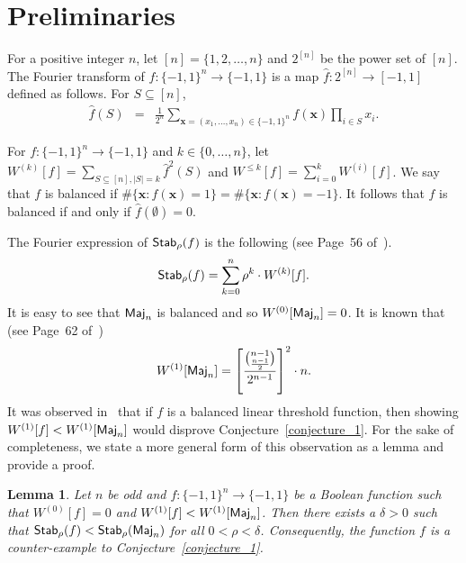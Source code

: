 \documentclass[11pt]{article}
\newtheorem{lemma} {Lemma}
\newcommand{\sym}[1]{{\sf #1}}
\begin{document}
\section{Preliminaries \label{sec-prelim} }
For a positive integer $n$, let $[n] = \{1, 2,\ldots, n\}$ and $2^{[n]}$ be the power set of $[n]$. 
The Fourier transform of $f:\{-1,1\}^n\rightarrow \{-1,1\}$ is a map $\hat{f}:2^{[n]}\rightarrow [-1,1]$ defined as follows. For $S\subseteq [n]$, 
\begin{eqnarray}\label{eqn-fourier}
	\hat{f}(S) & = & \frac{1}{2^n} \sum_{\mathbf{x}=(x_1,\ldots,x_n)\in\{-1,1\}^n} f(\mathbf{x}) \prod_{i\in S}x_i.
\end{eqnarray}

For $f:\{-1,1\}^n\rightarrow\{-1,1\}$ and $k\in\{0,\ldots,n\}$, let ${W}^{(k)}[f]=\sum_{S\subseteq[n],|S|=k}\hat{f}^2(S)$
and ${W}^{\leq k}[f]=\sum_{i=0}^k {W}^{(i)}[f]$.  
We say that $f$ is balanced if $\#\{\mathbf{x}:f(\mathbf{x})=1\} = \#\{\mathbf{x}:f(\mathbf{x})=-1\}$. It follows that $f$ is balanced if and only if 
$\hat{f}(\emptyset)=0$.

The Fourier expression of $\sym{Stab}_{\rho}(f)$ is the following (see Page~56 of~\cite{o2014analysis}). 
\begin{equation}\label{noise_stability}
    \sym{Stab}_{\rho}(f) = \sum_{k=0}^{n}\rho^{k}\cdot {W}^{(k)}[f].
\end{equation}
It is easy to see that $\sym{Maj}_n$ is balanced and so ${W}^{(0)}[\sym{Maj}_n]=0$. It is known that (see Page~62 of~\cite{o2014analysis}) 
\begin{equation}\label{maj_level_1_fourier_weight}
    {W}^{(1)}[\sym{Maj}_{n}]=\left[\frac{{n-1\choose \frac{n-1}{2}}}{2^{n-1}}\right]^2\cdot n.
\end{equation}
It was observed in~\cite{jain2017counterexample} that if $f$ is a balanced linear threshold function, then showing 
${W}^{(1)}[f] < {W}^{(1)}[\sym{Maj}_n]$ would disprove Conjecture~\ref{conjecture_1}. For the sake of completeness, we state a more general form of this observation 
as a lemma and provide a proof.

\begin{lemma}\label{our_lemma_1}
Let $n$ be odd and $f:\{-1,1\}^n\rightarrow\{-1,1\}$ be a Boolean function such that ${W}^{(0)}[f]=0$ and ${W}^{(1)}[f]<{W}^{(1)}[\sym{Maj}_n]$. 
Then there exists a $\delta>0$ such that $\sym{Stab}_{\rho}(f)<\sym{Stab}_{\rho}(\sym{Maj}_{n})$ for all $0<\rho<\delta$. Consequently, the function $f$ is a 
	counter-example to Conjecture~\ref{conjecture_1}.
\end{lemma}
\end{document}
